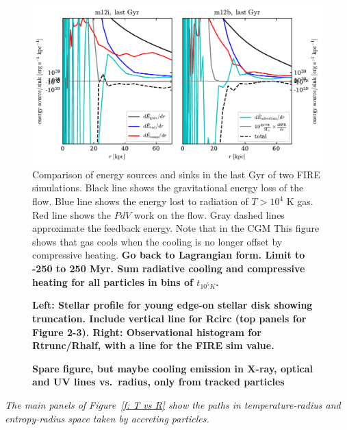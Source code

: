 \documentclass[fleqn,usenatbib]{mnras}
\begin{document}
\begin{figure}
\includegraphics{Edot.pdf}
\caption{
Comparison of energy sources and sinks in the last Gyr of two FIRE simulations. Black line shows the gravitational energy loss of the flow.  Blue line shows the energy lost to radiation of $T>10^4$ K gas. Red line shows the $PdV$ work on the flow. Gray dashed lines approximate the feedback energy. 
Note that in the CGM This figure shows that gas cools when the cooling is no longer offset by compressive heating.
\textbf{
Go back to Lagrangian form.
Limit to -250 to 250 Myr.
Sum radiative cooling and compressive heating for all particles in bins of $t_{10^5 K}$.
}
}
\label{f:Edot}
\end{figure}

\begin{figure}
    \centering
    \caption{
    \textbf{
    Left:
    Stellar profile for young edge-on stellar disk showing truncation.
    Include vertical line for Rcirc (top panels for Figure 2-3).
    Right:
    Observational histogram for Rtrunc/Rhalf, with a line for the FIRE sim value.
    }
    }
    \label{f:emission}
\end{figure}

\begin{figure}
    \centering
    \caption{
    \textbf{Spare figure, but maybe
    cooling emission in X-ray, optical and UV lines vs.\ radius, only from tracked particles
    }
    }
    \label{f:emission}
\end{figure}

\textit{
The main panels of Figure~\ref{f: T vs R} show the paths in temperature-radius and entropy-radius space taken by accreting particles.
}
\end{document}
